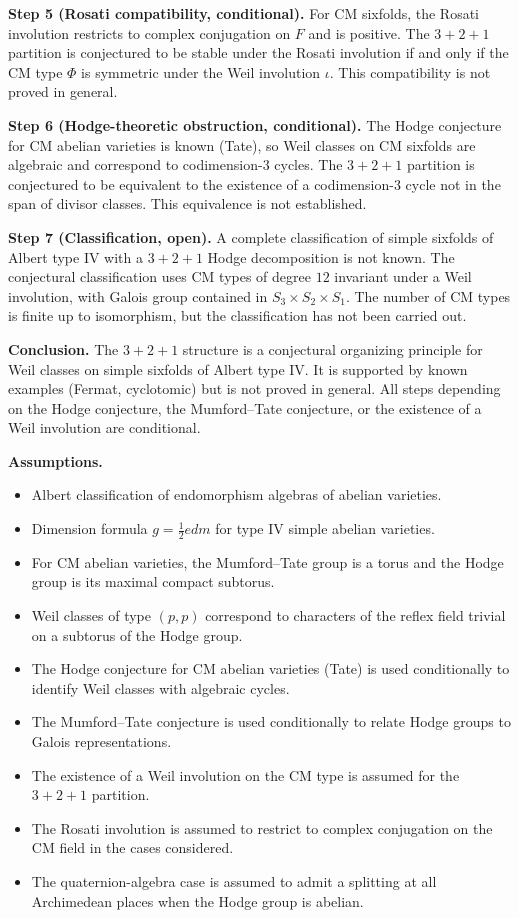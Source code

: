 \documentclass{article}
\begin{document}
\medskip
\noindent\textbf{Step 5 (Rosati compatibility, conditional).}
For CM sixfolds, the Rosati involution restricts to complex conjugation on \(F\) and is positive. The \(3+2+1\) partition is conjectured to be stable under the Rosati involution if and only if the CM type \(\Phi\) is symmetric under the Weil involution \(\iota\). This compatibility is not proved in general.

\medskip
\noindent\textbf{Step 6 (Hodge-theoretic obstruction, conditional).}
The Hodge conjecture for CM abelian varieties is known (Tate), so Weil classes on CM sixfolds are algebraic and correspond to codimension-\(3\) cycles. The \(3+2+1\) partition is conjectured to be equivalent to the existence of a codimension-\(3\) cycle not in the span of divisor classes. This equivalence is not established.

\medskip
\noindent\textbf{Step 7 (Classification, open).}
A complete classification of simple sixfolds of Albert type IV with a \(3+2+1\) Hodge decomposition is not known. The conjectural classification uses CM types of degree \(12\) invariant under a Weil involution, with Galois group contained in \(S_3\times S_2\times S_1\). The number of CM types is finite up to isomorphism, but the classification has not been carried out.

\medskip
\noindent\textbf{Conclusion.}
The \(3+2+1\) structure is a conjectural organizing principle for Weil classes on simple sixfolds of Albert type IV. It is supported by known examples (Fermat, cyclotomic) but is not proved in general. All steps depending on the Hodge conjecture, the Mumford--Tate conjecture, or the existence of a Weil involution are conditional.

\medskip
\noindent\textbf{Assumptions.}
\begin{itemize}
\item Albert classification of endomorphism algebras of abelian varieties.
\item Dimension formula \(g=\tfrac12 e d m\) for type IV simple abelian varieties.
\item For CM abelian varieties, the Mumford--Tate group is a torus and the Hodge group is its maximal compact subtorus.
\item Weil classes of type \((p,p)\) correspond to characters of the reflex field trivial on a subtorus of the Hodge group.
\item The Hodge conjecture for CM abelian varieties (Tate) is used conditionally to identify Weil classes with algebraic cycles.
\item The Mumford--Tate conjecture is used conditionally to relate Hodge groups to Galois representations.
\item The existence of a Weil involution on the CM type is assumed for the \(3+2+1\) partition.
\item The Rosati involution is assumed to restrict to complex conjugation on the CM field in the cases considered.
\item The quaternion-algebra case is assumed to admit a splitting at all Archimedean places when the Hodge group is abelian.
\end{itemize}
\end{document}
